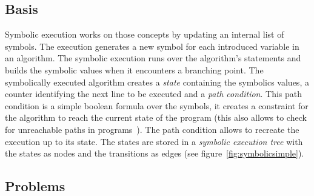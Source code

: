 \documentclass[11pt]{IEEEtran}
\begin{document}
    \subsection{Basis}
      \label{sub:basis}
      Symbolic execution works on those concepts by updating an internal list of symbols. The execution generates a new symbol for each introduced variable in an algorithm\cite{newapproach}. The symbolic execution runs over the algorithm's statements and builds the symbolic values when it encounters a branching point. The symbolically executed algorithm creates a \emph{state}\cite{visserWillemCorina} containing the symbolics values, a counter identifying the next line to be executed and a \emph{path condition}. This path condition is a simple boolean formula over the symbols, it creates a constraint for the algorithm to reach the current state of the program (this also allows to check for unreachable paths in programs~\cite{InfeasiblePathsEliminationWithSymbolicExecTechniques}). The path condition allows to recreate the execution up to its state. The states are stored in a \emph{symbolic execution tree} with the states as nodes and the transitions as edges (see figure~\ref{fig:symbolicsimple}).
    \subsection{Problems}
      \label{sec:problems}
\end{document}
